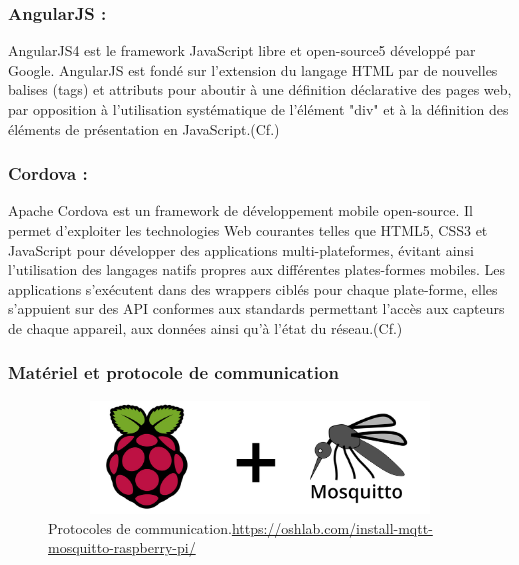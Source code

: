 \documentclass[12pt,a4paper]{article}
\begin{document}
\subsubsection*{AngularJS :}
AngularJS4 est le framework JavaScript libre et open-source5 développé par Google.
AngularJS est fondé sur l’extension du langage HTML par de nouvelles balises (tags) et attributs pour aboutir à une définition déclarative des pages web, par opposition à l’utilisation systématique de l’élément "div" et à la définition des éléments de présentation en JavaScript.(Cf.\cite{ref33})

\subsubsection*{Cordova :}
Apache Cordova est un framework de développement mobile open-source. Il permet d'exploiter les technologies Web courantes telles que HTML5, CSS3 et JavaScript pour développer des applications multi-plateformes, évitant ainsi l'utilisation des langages natifs propres aux différentes plates-formes mobiles. Les applications s'exécutent dans des wrappers ciblés pour chaque plate-forme, elles s'appuient sur des API conformes aux standards permettant l'accès aux capteurs de chaque appareil, aux données ainsi qu'à l'état du réseau.(Cf.\cite{Ref34})

\subsubsection{Matériel et protocole de communication}
\begin{figure}[ht]
\centering
    \includegraphics[width = 15cm,height=3cm]{mosqutto.jpg}
    \caption {Protocoles de communication.\href{url}{https://oshlab.com/install-mqtt-mosquitto-raspberry-pi/}} 
	\label{label-image1}
\end{figure}

\end{document}
